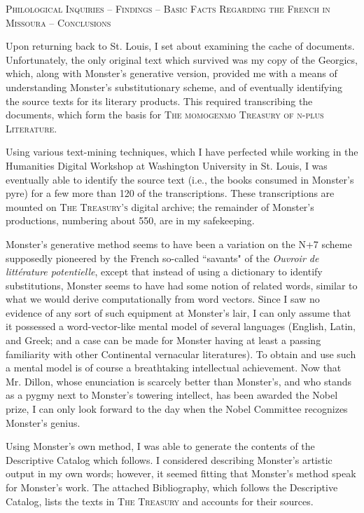 \par
\begin{center}
\textsc{Philological Inquiries – Findings – Basic Facts Regarding the French in Missoura – Conclusions}
\end{center}
\par
Upon returning back to St. Louis, I set about examining the cache of documents.  Unfortunately, the only original text which survived was my copy of the Georgics, which, along with Monster's generative version, provided me with a means of understanding Monster's substitutionary scheme, and of eventually identifying the source texts for its literary products.  This required transcribing the documents, which form the basis for \textsc{The momogenmo Treasury of n-plus Literature}.
\par
Using various text-mining techniques, which I have perfected while working in the Humanities Digital Workshop at Washington University in St. Louis, I was eventually able to identify the source text (i.e., the books consumed in Monster's pyre) for a few more than 120 of the transcriptions.  These transcriptions are mounted on \textsc{The Treasury's} digital archive; the remainder of Monster's productions, numbering about 550, are in my safekeeping.
\par
Monster's generative method seems to have been a variation on the N+7 scheme supposedly pioneered by the French so-called ``savants" of the \textit{Ouvroir de littérature potentielle}, except that instead of using a dictionary to identify substitutions, Monster seems to have had some notion of related words, similar to what we would derive computationally from word vectors.  Since I saw no evidence of any sort of such equipment at Monster's lair, I can only assume that it possessed a word-vector-like mental model of several languages (English, Latin, and Greek; and a case can be made for Monster having at least a passing familiarity with other Continental vernacular literatures).  To obtain and use such a mental model is of course a breathtaking intellectual achievement.  Now that Mr. Dillon, whose enunciation is scarcely better than Monster's, and who stands as a pygmy next to Monster's towering intellect, has been awarded the Nobel prize, I can only look forward to the day when the Nobel Committee recognizes Monster's genius.
\par
Using Monster's own method, I was able to generate the contents of the Descriptive Catalog which follows.  I considered describing Monster's artistic output in my own words; however, it seemed fitting that Monster's method speak for Monster's work.  The attached Bibliography, which follows the Descriptive Catalog, lists the texts in \textsc{The Treasury} and accounts for their sources.
